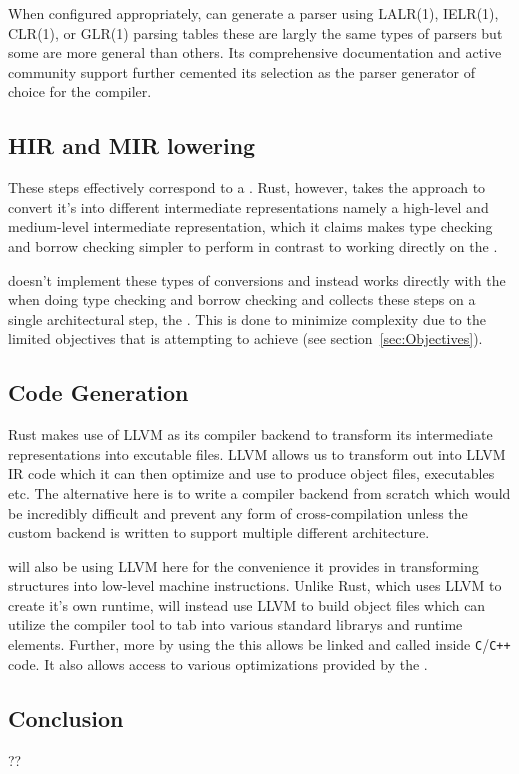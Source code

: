 When configured appropriately, \parserGen{} can generate a \textit{\parserType{}}
parser using LALR(1), IELR(1), CLR(1), or GLR(1) parsing tables these are largly the
same types of parsers but some are more general than others. Its comprehensive
documentation and active community support further cemented its selection as the
parser generator of choice for the \lang{} compiler.

\subsection{HIR and MIR lowering}
\label{sec:hirmir}

These steps effectively correspond to a \static{}. Rust, however, takes the approach
to convert it's \ast{} into different intermediate representations namely a
high-level and medium-level intermediate representation, which it claims makes type
checking and borrow checking simpler to perform in contrast to working directly on
the \ast. 

\lang{} doesn't implement these types of conversions and instead works directly with
the \ast{} when doing type checking and borrow checking and collects these steps on a
single architectural step, the \static. This is done to minimize complexity due to
the limited objectives that \lang{} is attempting to achieve (see
section~\ref{sec:Objectives}).

\subsection{Code Generation}
\label{sec:codeGenTech}

Rust makes use of LLVM as its compiler backend to transform its intermediate
representations into excutable files. LLVM allows us to transform out \ast{} into
LLVM IR code which it can then optimize and use to produce object files, executables
etc. The alternative here is to write a compiler backend from scratch which would be
incredibly difficult and prevent any form of cross-compilation unless the custom
backend is written to support multiple different architecture. 

\lang{} will also be using LLVM here for the convenience it provides in transforming
\ast{} structures into low-level machine instructions. Unlike Rust, which uses LLVM
to create it's own runtime, \lang{} will instead use LLVM to build object files which
can utilize the \gcc{} compiler tool to tab into various standard librarys and
runtime elements. Further, more by using the \gcc{} this allows \lang{} be linked and
called inside \texttt{C}/\texttt{C++} code. It also allows \lang{} access to various
optimizations provided by the \gcc.


\subsection{Conclusion}
\label{sec:techCon}

??


\newpage
